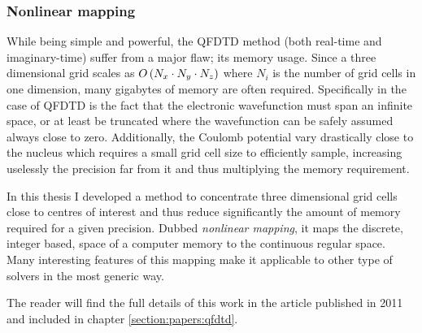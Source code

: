 \subsubsection{Nonlinear mapping}
\label{section:tools:qfdtd:mapping}

While being simple and powerful, the QFDTD method (both real-time and
imaginary-time) suffer from a major flaw; its memory usage. Since a three
dimensional grid scales as $O\left( N_x \cdot N_y \cdot N_z \right)$ where $N_i$ is the
number of grid cells in one dimension, many gigabytes of memory are often
required. Specifically in the case of QFDTD is the fact that the electronic
wavefunction must span an infinite space, or at least be truncated where
the wavefunction can be safely assumed always close to zero. Additionally,
the Coulomb potential vary drastically close to the nucleus which requires
a small grid cell size to efficiently sample, increasing uselessly the precision
far from it and thus multiplying the memory requirement.

In this thesis I developed a method to concentrate three dimensional grid cells
close to centres of interest and thus reduce significantly the amount of memory
required for a given precision. Dubbed \textit{nonlinear mapping}, it maps the
discrete, integer based, space of a computer memory to the continuous regular
space. Many interesting features of this mapping make it applicable to other
type of solvers in the most generic way.

The reader will find the full details of this work in the article published
in 2011 and included in chapter \ref{section:papers:qfdtd}.


